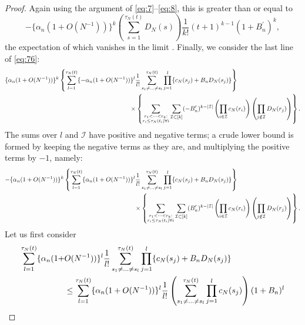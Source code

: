 \documentclass{article}
\newcommand{\1}[1]{\mathbbm{1}_{#1}}
\begin{document}
\begin{proof}
Again using the argument of \eqref{eq:7}--\eqref{eq:8}, this is greater than or equal to
\begin{equation}
- \{ \alpha_n (1 + O(N^{-1}) ) \}^k \left( \sum_{s=1}^{\tau_N(t)} D_N(s) \right) \frac{1}{k!} (t+1)^{k-1} (1 + B_n^\prime)^k , \label{eq:80a}
\end{equation}
the expectation of which vanishes in the limit \citep[Equation (3.5)]{brown2021}.
Finally, we consider the last line of \eqref{eq:76}:
\begin{align}
\{ \alpha_n (1 + O(N^{-1}) ) \}^k
&\left\{ \sum_{l=1}^{\tau_N(t)} \{ - \alpha_n (1 + O(N^{-1}) ) \}^l \frac{1}{l!}
\sum_{s_1 \neq \dots \neq s_l}^{\tau_N(t)} \prod_{j=1}^l
\{ c_N(s_j) + B_n D_N(s_j) \} \right\} \notag\\
&\hspace{4cm}\times
\left\{ \sum_{\substack{r_1 <\dots< r_k :\\ r_i \leq \tau_N(t_i) \forall i}}
\sum_{\mathcal{I} \subset [k]} (-B_n^\prime)^{k-|\mathcal{I}|}
\left( \prod_{i\in\mathcal{I}} c_N(r_i) \right)
\left( \prod_{j\notin\mathcal{I}} D_N(r_j) \right)
\right\} .
\end{align}
The sums over $l$ and $\mathcal{I}$ have positive and negative terms; a crude lower bound is formed by keeping the negative terms as they are, and multiplying the positive terms by $-1$, namely:
\begin{align}
- \{ \alpha_n (1 + O(N^{-1}) ) \}^k
&\left\{ \sum_{l=1}^{\tau_N(t)} \{ \alpha_n (1 + O(N^{-1}) ) \}^l \frac{1}{l!}
\sum_{s_1 \neq \dots \neq s_l}^{\tau_N(t)} \prod_{j=1}^l
\{ c_N(s_j) + B_n D_N(s_j) \} \right\} \notag\\
&\hspace{4cm}\times
\left\{ \sum_{\substack{r_1 <\dots< r_k :\\ r_i \leq \tau_N(t_i) \forall i}}
\sum_{\mathcal{I} \subset [k]} (B_n^\prime)^{k-|\mathcal{I}|}
\left( \prod_{i\in\mathcal{I}} c_N(r_i) \right)
\left( \prod_{j\notin\mathcal{I}} D_N(r_j) \right)
\right\} . \label{eq:82}
\end{align}
Let us first consider
\begin{align}
\sum_{l=1}^{\tau_N(t)} \{ \alpha_n (1 + &O(N^{-1}) ) \}^l \frac{1}{l!}
\sum_{s_1 \neq \dots \neq s_l}^{\tau_N(t)} \prod_{j=1}^l
\{ c_N(s_j) + B_n D_N(s_j) \} \notag\\
&\leq \sum_{l=1}^{\tau_N(t)} \{ \alpha_n (1 + O(N^{-1}) ) \}^l \frac{1}{l!}
\left( \sum_{s_1 \neq \dots \neq s_l}^{\tau_N(t)} \prod_{j=1}^l c_N(s_j) \right) (1+B_n)^l \notag\\

\end{align}
\end{proof}
\end{document}
